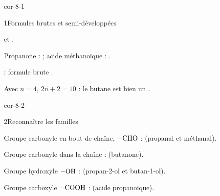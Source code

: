 \corrigesSouples

\begin{blocLivre}{cor-8-1}
\begin{corrige}{1}{Formules brutes et semi-développées}
\begin{questions}
\item {} et .
\item Propanone :  ; acide méthanoïque : .
\item {} : formule brute .
\item Avec $n=4$, $2n+2=10$ : le butane est bien un .
\end{questions}
\end{corrige}
\end{blocLivre}
\begin{blocLivre}{cor-8-2}
\begin{corrige}{2}{Reconnaître les familles}
\begin{questions}
\item Groupe carbonyle en bout de chaîne, $\ce{-CHO}$ :  (propanal et méthanal).
\item Groupe carbonyle dans la chaîne :  (butanone).
\item Groupe hydroxyle $\ce{-OH}$ :  (propan-2-ol et butan-1-ol).
\item Groupe carboxyle $\ce{-COOH}$ :  (acide propanoïque).
\end{questions}
\end{corrige}
\end{blocLivre}
